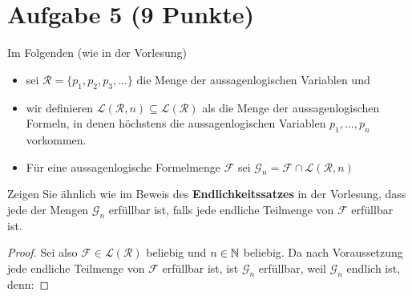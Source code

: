 \documentclass[12pt,a4paper]{article}
\renewcommand{\L}{\mathcal{L}} %
\newcommand{\RR}{\mathcal{R}} %
\newcommand{\F}{\mathcal{F}}
\newcommand{\G}{\mathcal{G}}
\begin{document}
\section*{Aufgabe 5 (9 Punkte)}
Im Folgenden (wie in der Vorlesung)
\begin{itemize}
\item sei $\RR=\big\lbrace p_1,p_2,p_3,\ldots\big\rbrace$ die Menge der aussagenlogischen Variablen und
\item wir definieren $\L(\RR,n)\subseteq\L(\RR)$ als die Menge der aussagenlogischen Formeln, in denen höchstens die aussagenlogischen Variablen $p_1,\ldots,p_n$ vorkommen.
\item Für eine aussagenlogische Formelmenge $\F$ sei $\G_n=\F\cap\L(\RR,n)$
\end{itemize}
Zeigen Sie ähnlich wie im Beweis des \textbf{Endlichkeitssatzes} in der Vorlesung, dass jede der Mengen $\G_n$ erfüllbar ist, falls jede endliche Teilmenge von $\F$ erfüllbar ist.

\begin{proof}
Sei also $\F\in\L(\RR)$ beliebig und $n\in\mathbb{N}$ beliebig. Da nach Voraussetzung jede endliche Teilmenge von $\F$ erfüllbar ist, ist $\G_n$ erfüllbar, weil $\G_n$ endlich ist, denn:
\end{proof}
\end{document}

